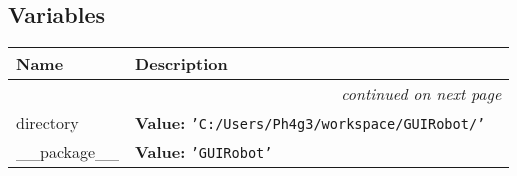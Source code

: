   \subsection{Variables}

    \vspace{-1cm}
\hspace{\varindent}\begin{longtable}{|p{\varnamewidth}|p{\vardescrwidth}|l}
\cline{1-2}
\cline{1-2} \centering \textbf{Name} & \centering \textbf{Description}& \\
\cline{1-2}
\endhead\cline{1-2}\multicolumn{3}{r}{\small\textit{continued on next page}}\\\endfoot\cline{1-2}
\endlastfoot\raggedright d\-i\-r\-e\-c\-t\-o\-r\-y\- & \raggedright \textbf{Value:} 
{\tt \texttt{'}\texttt{C:/Users/Ph4g3/workspace/GUIRobot/}\texttt{'}}&\\
\cline{1-2}
\raggedright \_\-\_\-p\-a\-c\-k\-a\-g\-e\-\_\-\_\- & \raggedright \textbf{Value:} 
{\tt \texttt{'}\texttt{GUIRobot}\texttt{'}}&\\
\cline{1-2}
\end{longtable}

